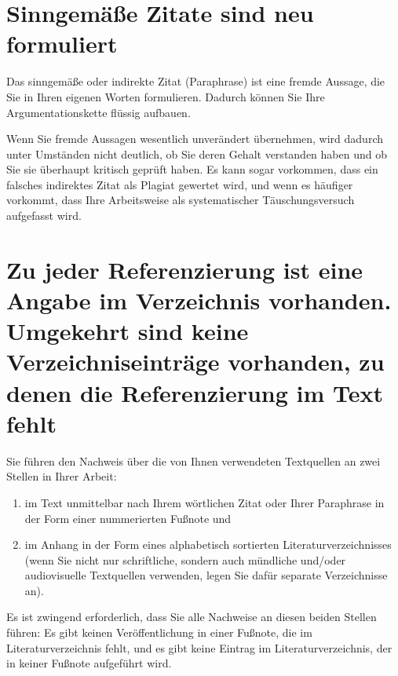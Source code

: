 \section{Sinngemäße Zitate sind neu formuliert}
\label{sec:sinngemaesze-zitate}

Das sinngemäße oder indirekte Zitat (Paraphrase) ist eine fremde Aussage, die Sie in Ihren eigenen Worten formulieren. Dadurch können Sie Ihre Argumentationskette flüssig aufbauen.

Wenn Sie fremde Aussagen wesentlich unverändert übernehmen, wird dadurch unter Umständen nicht deutlich, ob Sie deren Gehalt verstanden haben und ob Sie sie überhaupt kritisch geprüft haben. Es kann sogar vorkommen, dass ein falsches indirektes Zitat als Plagiat gewertet wird, und wenn es häufiger vorkommt, dass Ihre Arbeitsweise als systematischer Täuschungsversuch aufgefasst wird.

\section{Zu jeder Referenzierung ist eine Angabe im Verzeichnis vorhanden. Umgekehrt sind keine Verzeichniseinträge vorhanden, zu denen die Referenzierung im Text fehlt}
\label{sec:referenzierung-verzeichnis}

Sie führen den Nachweis über die von Ihnen verwendeten Textquellen an zwei Stellen in Ihrer Arbeit:
\begin{enumerate}
\item im Text unmittelbar nach Ihrem wörtlichen Zitat oder Ihrer Paraphrase in der Form einer nummerierten Fußnote und
\item im Anhang in der Form eines alphabetisch sortierten Literaturverzeichnisses (wenn Sie nicht nur schriftliche, sondern auch mündliche und/oder audiovisuelle Textquellen verwenden, legen Sie dafür separate Verzeichnisse an).
\end{enumerate}

Es ist zwingend erforderlich, dass Sie alle Nachweise an diesen beiden Stellen führen: Es gibt keinen Veröffentlichung in einer Fußnote, die im Literaturverzeichnis fehlt, und es gibt keine Eintrag im Literaturverzeichnis, der in keiner Fußnote aufgeführt wird.